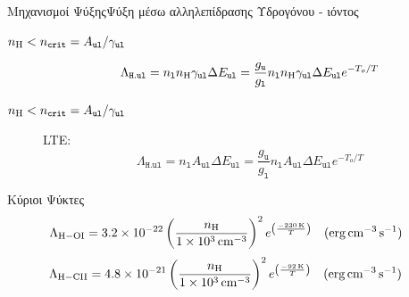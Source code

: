 \documentclass{beamer}
\begin{document}
\begin{frame}{Μηχανισμοί Ψύξης}{Ψύξη μέσω αλληλεπίδρασης Υδρογόνου - ιόντος}
	\begin{description}
		\item[$n_{\ce{H}}<n_\mathtt{crit}=A_\mathtt{ul}/\gamma _\mathtt{ul}$]{	
			\begin{equation}
			\Lambda _\mathtt{H.ul} = n_\mathtt{l} n_{\ce{H}} \gamma _\mathtt{ul} \Delta E _\mathtt{ul} = \frac{g_\mathtt{u}}{g_\mathtt{l}} n_\mathtt{l} n_{\ce{H}} \gamma _\mathtt{ul} \Delta E_\mathtt{ul} e^{-T_o/T}
			\end{equation}}
		\item[$n_{\ce{H}}<n_\mathtt{crit}=A_\mathtt{ul}/\gamma _\mathtt{ul}$]{LTE:
		\begin{equation}
		\Lambda _\mathtt{H.ul} = n_\mathtt{l}  A _\mathtt{ul} \Delta E _\mathtt{ul} = \frac{g_\mathtt{u}}{g_\mathtt{l}} n_\mathtt{l} A _\mathtt{ul} \Delta E_\mathtt{ul} e^{-T_o/T}
		\end{equation}
	}
	\end{description}

\begin{block}{Κύριοι Ψύκτες}
			\begin{equation}
		\Lambda _{\ce{H - OI}}=\num{3.2e-22} \left( \frac{n_{\ce{H}}}{\SI{1e3}{cm^{-3}}} \right)^2 e^{\left( \frac{\SI{-230}{K}}{T} \right) } \qq{(\si{erg.cm^{-3}.s^{-1}})} 
		\end{equation}
		\begin{equation}
	\Lambda _{\ce{H - CII}}=\num{4.8e-21} \left( \frac{n_{\ce{H}}}{\SI{1e3}{cm^{-3}}} \right)^2 e^{\left( \frac{\SI{-92}{K}}{T} \right) } \qq{(\si{erg.cm^{-3}.s^{-1}})} 
	\end{equation}
\end{block}
\end{frame}
\end{document}

